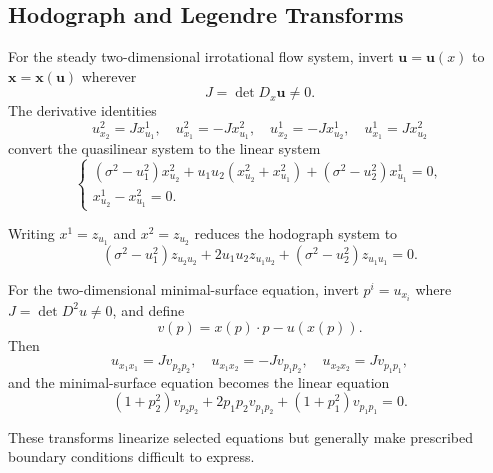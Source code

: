 \subsection{Hodograph and Legendre Transforms}
\label{sec:hodograph-legendre-transforms}

\begin{example}
\label{ex:hodograph-transform-irrotational-flow}
For the steady two-dimensional irrotational flow system, invert
$\mathbf u=\mathbf u(x)$ to $\mathbf x=\mathbf x(\mathbf u)$ wherever
\[
J=\det D_x\mathbf u\ne0.
\]
The derivative identities
\[
u^2_{x_2}=Jx^1_{u_1},\quad u^2_{x_1}=-Jx^2_{u_1},\quad
u^1_{x_2}=-Jx^1_{u_2},\quad u^1_{x_1}=Jx^2_{u_2}
\]
convert the quasilinear system to the linear system
\[
\begin{cases}
(\sigma^2-u_1^2)x^2_{u_2}+u_1u_2(x^2_{u_2}+x^2_{u_1})
+(\sigma^2-u_2^2)x^1_{u_1}=0,\\
x^1_{u_2}-x^2_{u_1}=0.
\end{cases}
\]
\end{example}

\begin{remark}
\label{rem:hodograph-potential-simplification}

Writing $x^1=z_{u_1}$ and $x^2=z_{u_2}$ reduces the hodograph system to
\[
(\sigma^2-u_1^2)z_{u_2u_2}+2u_1u_2z_{u_1u_2}
+(\sigma^2-u_2^2)z_{u_1u_1}=0.
\]
\end{remark}

\begin{example}
\label{ex:legendre-transform-minimal-surface}

For the two-dimensional minimal-surface equation, invert
$p^i=u_{x_i}$ where $J=\det D^2u\ne0$, and define
\[
v(p)=x(p)\cdot p-u(x(p)).
\]
Then
\[
u_{x_1x_1}=Jv_{p_2p_2},\quad u_{x_1x_2}=-Jv_{p_1p_2},\quad
u_{x_2x_2}=Jv_{p_1p_1},
\]
and the minimal-surface equation becomes the linear equation
\[
(1+p_2^2)v_{p_2p_2}+2p_1p_2v_{p_1p_2}+(1+p_1^2)v_{p_1p_1}=0.
\]
\end{example}

\begin{remark}
\label{rem:hodograph-legendre-practical-difficulty}

These transforms linearize selected equations but generally make prescribed
boundary conditions difficult to express.
\end{remark}

